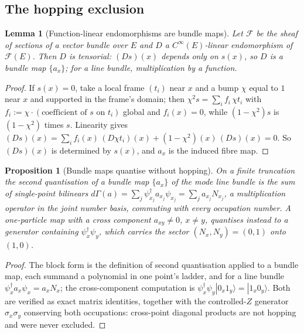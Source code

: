 \documentclass[11pt]{article}
\newtheorem{proposition}[theorem]{Proposition}
\newtheorem{lemma}[theorem]{Lemma}
\theoremstyle{definition}
\begin{document}
\subsection{The hopping exclusion}\label{app:hopping}

\begin{lemma}[Function-linear endomorphisms are bundle maps]\label{lem:supportT5}
Let $\mathcal{F}$ be the sheaf of sections of a vector bundle over $E$ and $D$ a $C^\infty(E)$-linear endomorphism of $\mathcal{F}(E)$. Then $D$ is tensorial: $(Ds)(x)$ depends only on $s(x)$, so $D$ is a bundle map $\{a_x\}$; for a line bundle, multiplication by a function.
\end{lemma}

\begin{proof}
If $s(x) = 0$, take a local frame $(t_i)$ near $x$ and a bump $\chi$ equal to $1$ near $x$ and supported in the frame's domain; then $\chi^2 s = \sum_i f_i\, \chi t_i$ with $f_i := \chi \cdot (\text{coefficient of } s \text{ on } t_i)$ global and $f_i(x) = 0$, while $(1 - \chi^2)s$ is $(1 - \chi^2)$ times $s$. Linearity gives $(Ds)(x) = \sum_i f_i(x)\,(D\chi t_i)(x) + (1 - \chi^2)(x)\,(Ds)(x) = 0$. So $(Ds)(x)$ is determined by $s(x)$, and $a_x$ is the induced fibre map.
\end{proof}

\begin{proposition}[Bundle maps quantise without hopping]\label{prop:quantiseT5}
On a finite truncation the second quantisation of a bundle map $\{a_x\}$ of the mode line bundle is the sum of single-point bilinears $d\Gamma(a) = \sum_j \psi^{\dagger}_{x_j} a_{x_j} \psi_{x_j} = \sum_j a_{x_j} N_{x_j}$, a multiplication operator in the joint number basis, commuting with every occupation number. A one-particle map with a cross component $a_{xy} \neq 0$, $x \neq y$, quantises instead to a generator containing $\psi^{\dagger}_x\psi_y$, which carries the sector $(N_x, N_y) = (0,1)$ onto $(1,0)$.
\end{proposition}

\begin{proof}
The block form is the definition of second quantisation applied to a bundle map, each summand a polynomial in one point's ladder, and for a line bundle $\psi^{\dagger}_x a_x \psi_x = a_x N_x$; the cross-component computation is $\psi^{\dagger}_x\psi_y|0_x 1_y\rangle = |1_x 0_y\rangle$. Both are verified as exact matrix identities, together with the controlled-$Z$ generator $\sigma_x\sigma_y$ conserving both occupations: cross-point diagonal products are not hopping and were never excluded.
\end{proof}
\end{document}
